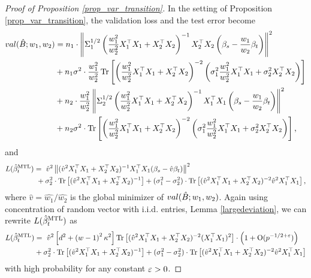 \begin{proof}[Proof of Proposition \ref{prop_var_transition}]
In the setting of Proposition \ref{prop_var_transition}, the validation loss and the test error become
\begin{align*}
		val(\hat{B}; w_1, w_2)
	&=  n_1 \cdot \left\| \Sigma_1^{1/2}\left(\frac{w_1^2}{w_2^2} X_1^{\top}X_1 + X_2^{\top}X_2\right)^{-1}X_2^{\top}X_2\left (\beta_s - \frac{w_1}{w_2}\beta_t\right) \right\|^2 \nonumber \\
		&+ n_1 \sigma^2 \cdot \frac{w_1^2}{w_2^2} \operatorname{Tr}\left[\left(\frac{w_1^2}{w_2^2}  X_1^{\top}X_1 + X_2^{\top}X_2\right)^{-2} \left(\sigma_1^2 \frac{w_1^2}{w_2^2}  X_1^{\top}X_1 + \sigma_2^2  X_2^{\top}X_2\right)\right] \nonumber \\
		&+ n_2 \cdot \frac{w_1^2}{w_2^2}\left\| \Sigma_2^{1/2}\left(\frac{w_1^2}{w_2^2} X_1^{\top}X_1 + X_2^{\top}X_2\right)^{-1}X_1^{\top}X_1\left(\beta_s - \frac{w_1}{w_2}\beta_t\right) \right\|^2 \nonumber \\
		&+ n_2 \sigma^2 \cdot \operatorname{Tr}\left[\left(\frac{w_1^2}{w_2^2} X_1^{\top}X_1 + X_2^{\top}X_2\right)^{-2} \left(\sigma_1^2 \frac{w_1^2}{w_2^2}  X_1^{\top}X_1 + \sigma_2^2  X_2^{\top}X_2\right)\right], 
\end{align*}
and 
\begin{align*}
	L(\hat{\beta}_t^{\text{MTL}}) &=~ \hat{v}^2 \left\|  (\hat{v}^2 X_1^{\top}X_1 + X_2^{\top}X_2)^{-1} X_1^{\top}X_1 (\beta_s - \hat{v} \beta_t) \right\|^2 \nonumber \\
			&~ + \sigma_2^2 \cdot \operatorname{Tr}\left[(\hat{v}^2 X_1^{\top}X_1 + X_2^{\top}X_2)^{-1} \right] + (\sigma_1^2 -\sigma_2^2) \cdot \operatorname{Tr}\left[(\hat{v}^2 X_1^{\top}X_1 + X_2^{\top}X_2)^{-2} \hat v^2 X_1^\top X_1\right],
\end{align*}
where $\hat v=\hat{w_1}/\hat{w_2}$ is the global minimizer of $val(\hat{B}; w_1, w_2)$. Again using concentration of random vector with i.i.d. entries, Lemma \ref{largedeviation}, we can rewrite $L(\hat{\beta}_t^{\text{MTL}})$ as
\begin{align*}
	L(\hat{\beta}_t^{\text{MTL}}) &=~ \hat{v}^2 \left[d^2 +\left( w-1\right)^2\kappa^2\right]\operatorname{Tr}\left[ (\hat{v}^2 X_1^{\top}X_1 + X_2^{\top}X_2)^{-2} (X_1^{\top}X_1)^2\right] \cdot \left(1+\operatorname{O}(p^{-1/2+{\varepsilon}})\right)\nonumber \\
	& + \sigma_2^2 \cdot \operatorname{Tr}\left[(\hat{v}^2 X_1^{\top}X_1 + X_2^{\top}X_2)^{-1} \right] + (\sigma_1^2 -\sigma_2^2)  \cdot \operatorname{Tr}\left[(\hat{v}^2 X_1^{\top}X_1 + X_2^{\top}X_2)^{-2} \hat v^2X_1^\top X_1\right]
\end{align*}
with high probability for any constant ${\varepsilon}>0$. 




\end{proof}
